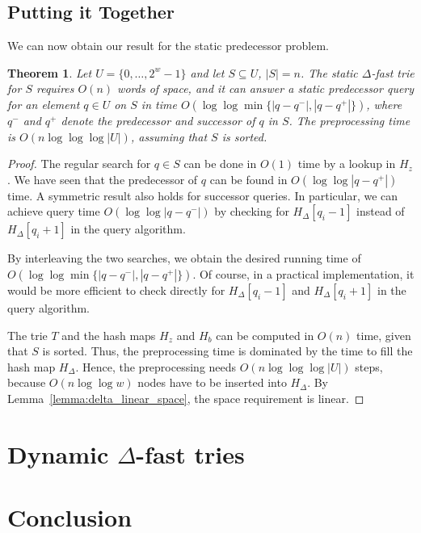 \documentclass[a4paper,11pt]{article}
\newtheorem{theorem}{Theorem}[section]
\newcommand{\?}{\mskip1.5mu}
\begin{document}
\subsection{Putting it Together}

We can now obtain our result for the static predecessor problem.

\begin{theorem}\label{thm:staticresult}
Let $U = \{0, \dots, 2^{w}-1\}$ and let
$S \subseteq U$, $|S| = n$.
The static $\Delta$-fast trie for $S$ requires
$O(n)$ words of space, and it can answer
a static predecessor query for an element $q \in U$ on $S$ in time
$O(\log \log \min\{|q-q^-|, |q-q^+|\})$,
where $q^-$ and $q^+$ denote the predecessor
and successor of $q$ in $S$.
The preprocessing time is 
$O(n \log\log \log |U|)$, assuming that
$S$ is sorted.
\end{theorem}

\begin{proof}
The regular search for $q \in S$ can be done in 
$O(1)$ time by a lookup in $H_z$. 
We have seen that the predecessor of $q$
can be found in $O(\log \log |q-q^+|)$ time.
A symmetric result also holds for 
successor queries.
In particular, we can achieve query time 
$O(\log \log |q-q^-|)$  by checking for
$H_\Delta[q_i-1]$ instead of $H_\Delta[q_i+1]$ in the 
query algorithm. 

By interleaving the two searches,
we obtain the desired running time of 
$O(\log\log \min\{|q - q^-|, |q - q^+|\})$. 
Of course, in a practical implementation, it would be 
more efficient to check directly for $H_\Delta[q_i-1]$
and $H_\Delta[q_i+1]$ in the query algorithm.

The trie $T$ and the hash maps $H_z$
and $H_b$ can be computed in $O(n)$ time, given that
$S$ is sorted.
Thus, the preprocessing time is dominated by the time to fill the 
hash map $H_\Delta$.  Hence, the preprocessing needs
$O(n\log\log\log |U|)$ steps, because $O(n\log\log w)$ nodes 
have to be
inserted into $H_\Delta$. 
By Lemma~\ref{lemma:delta_linear_space}, the space requirement
is linear.
\end{proof}

\section{Dynamic $\Delta$-fast tries}

\section{Conclusion}
\end{document}
